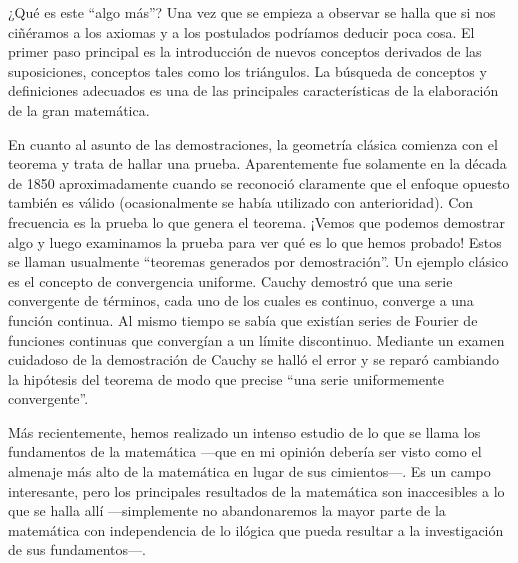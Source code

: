 \documentclass[a4paper, 12pt]{article}
\begin{document}
 

¿Qué es este ``algo más''? Una vez que se empieza a observar se halla que si nos ciñéramos a los axiomas y a los postulados podríamos deducir poca cosa. El primer paso principal es la introducción de nuevos conceptos derivados de las suposiciones, conceptos tales como los triángulos. La búsqueda de conceptos y definiciones adecuados es una de las principales características de la elaboración de la gran matemática.

 

En cuanto al asunto de las demostraciones, la geometría clásica comienza con el teorema y trata de hallar una prueba. Aparentemente fue solamente en la década de 1850 aproximadamente cuando se reconoció claramente que el enfoque opuesto también es válido (ocasionalmente se había utilizado con anterioridad). Con frecuencia es la prueba lo que genera el teorema. ¡Vemos que podemos demostrar algo y luego examinamos la prueba para ver qué es lo que hemos probado! Estos se llaman usualmente ``teoremas generados por demostración''. Un ejemplo clásico es el concepto de convergencia uniforme. Cauchy demostró que una serie convergente de términos, cada uno de los cuales es continuo, converge a una función continua. Al mismo tiempo se sabía que existían series de Fourier de funciones continuas que convergían a un límite discontinuo. Mediante un examen cuidadoso de la demostración de Cauchy se halló el error y se reparó cambiando la hipótesis del teorema de modo que precise ``una serie uniformemente convergente''.

 

Más recientemente, hemos realizado un intenso estudio de lo que se llama los fundamentos de la matemática ---que en mi opinión debería ser visto como el almenaje más alto de la matemática en lugar de sus cimientos---. Es un campo interesante, pero los principales resultados de la matemática son inaccesibles a lo que se halla allí ---simplemente no abandonaremos la mayor parte de la matemática con independencia de lo ilógica que pueda resultar a la investigación de sus fundamentos---.

 
\end{document}
